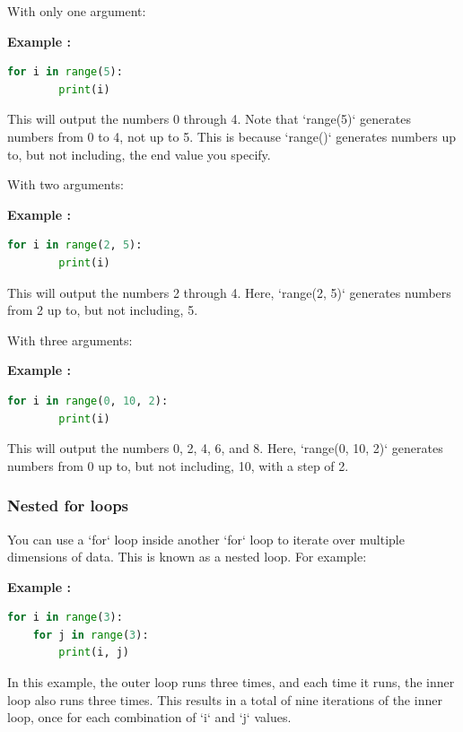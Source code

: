 \documentclass[12pt]{book}
\newtheorem{Example}{Example}[chapter]
\renewenvironment{Example}{\begin{trivlist}\item\relax
\textbf{Example \thesection: }}{\end{trivlist}}
\begin{document}
\begin{enumerate}
    \item With only one argument: \\
    \begin{Example}
    \begin{lstlisting}[language=Python]
    for i in range(5):
        print(i)
    \end{lstlisting}
    \end{Example}
    This will output the numbers 0 through 4. Note that `range(5)` generates numbers from 0 to 4, not up to 5. This is because `range()` generates numbers up to, but not including, the end value you specify.

    \item With two arguments: \\
    \begin{Example}
    \begin{lstlisting}[language=Python]
    for i in range(2, 5):
        print(i)
    \end{lstlisting}
    \end{Example}
    This will output the numbers 2 through 4. Here, `range(2, 5)` generates numbers from 2 up to, but not including, 5.

    \item With three arguments: \\
    \begin{Example}
    \begin{lstlisting}[language=Python]
    for i in range(0, 10, 2):
        print(i)
    \end{lstlisting}
    \end{Example}
    This will output the numbers 0, 2, 4, 6, and 8. Here, `range(0, 10, 2)` generates numbers from 0 up to, but not including, 10, with a step of 2.
\end{enumerate}

\subsubsection{Nested for loops}
You can use a `for` loop inside another `for` loop to iterate over multiple dimensions of data. This is known as a nested loop. For example:
\begin{Example}
\begin{lstlisting}[language=Python]
for i in range(3):
    for j in range(3):
        print(i, j)
\end{lstlisting}
\end{Example}
In this example, the outer loop runs three times, and each time it runs, the inner loop also runs three times. This results in a total of nine iterations of the inner loop, once for each combination of `i` and `j` values.
\end{document}

